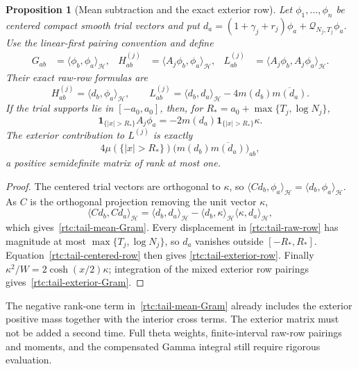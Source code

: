 \documentclass[11pt,a4paper]{article}
\numberwithin{equation}{section}
\newtheorem{proposition}[theorem]{Proposition}
\theoremstyle{definition}\newtheorem{definition}[theorem]{Definition}
\theoremstyle{remark}\newtheorem{remark}[theorem]{Remark}
\newcommand{\Hh}{\mathcal H}\newcommand{\Hw}{\mathcal H}
\newcommand{\ip}[2]{\langle#1,#2\rangle}\newcommand{\norm}[1]{\lVert#1\rVert}\newcommand{\abs}[1]{\lvert#1\rvert}
\begin{document}
\begin{proposition}[Mean subtraction and the exact exterior row]
\label{rtc:tail-gram}
Let $\phi_1,\ldots,\phi_n$ be centered compact smooth trial vectors and
put $d_a=(1+\gamma_j+r_j)\phi_a+\mathcal Q_{N_j,T_j}\phi_a$.
Use the linear-first pairing convention and define
\begin{align}
 G_{ab}&=\ip{\phi_b}{\phi_a}_{\Hh},&
 H^{(j)}_{ab}&=\ip{A_j\phi_b}{\phi_a}_{\Hh},&
 L^{(j)}_{ab}&=\ip{A_j\phi_b}{A_j\phi_a}_{\Hh}.
 \label{rtc:tail-GHL}
\end{align}
Their exact raw-row formulas are
\begin{equation}\label{rtc:tail-mean-Gram}
 H^{(j)}_{ab}=\ip{d_b}{\phi_a}_{\Hh},\qquad
 L^{(j)}_{ab}=\ip{d_b}{d_a}_{\Hh}
                  -4m(d_b)\overline{m(d_a)}.
\end{equation}
If the trial supports lie in $[-a_0,a_0]$, then, for
$R_*=a_0+\max\{T_j,\log N_j\}$,
\begin{equation}\label{rtc:tail-exterior-row}
 \mathbf1_{\{|x|>R_*\}}A_j\phi_a
 =-2m(d_a)\mathbf1_{\{|x|>R_*\}}\kappa.
\end{equation}
The exterior contribution to $L^{(j)}$ is exactly
\begin{equation}\label{rtc:tail-exterior-Gram}
 4\mu(\{|x|>R_*\})
       \bigl(m(d_b)\overline{m(d_a)}\bigr)_{ab},
\end{equation}
a positive semidefinite matrix of rank at most one.
\end{proposition}
\begin{proof}
The centered trial vectors are orthogonal to $\kappa$, so
$\ip{Cd_b}{\phi_a}_{\Hh}=\ip{d_b}{\phi_a}_{\Hh}$.
As $C$ is the orthogonal projection removing the unit vector $\kappa$,
\[
 \ip{Cd_b}{Cd_a}_{\Hh}
 =\ip{d_b}{d_a}_{\Hh}
  -\ip{d_b}{\kappa}_{\Hh}\ip{\kappa}{d_a}_{\Hh},
\]
which gives~\eqref{rtc:tail-mean-Gram}.  Every displacement in
\eqref{rtc:tail-raw-row} has magnitude at most
$\max\{T_j,\log N_j\}$, so $d_a$ vanishes outside $[-R_*,R_*]$.
Equation~\eqref{rtc:tail-centered-row} then gives
\eqref{rtc:tail-exterior-row}.  Finally
$\kappa^2/W=2\cosh(x/2)\kappa$; integration of the mixed exterior
row pairings gives~\eqref{rtc:tail-exterior-Gram}.
\end{proof}
The negative rank-one term in~\eqref{rtc:tail-mean-Gram} already
includes the exterior positive mass together with the interior cross
terms.  The exterior matrix must not be added a second time.  Full theta
weights, finite-interval raw-row pairings and moments, and the
compensated Gamma integral still require rigorous evaluation.
\end{document}
